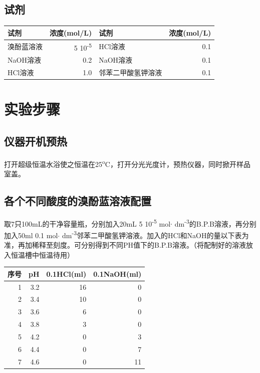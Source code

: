 \documentclass[11pt]{report}
\begin{document}
\section{试剂}
\label{sec:org343bc96}
\begin{center}
\begin{tabular}{lrlr}
试剂 & 浓度(mol/L) & 试剂 & 浓度(mol/L)\\
\hline
溴酚蓝溶液 & 5\texttimes{} 10\textsuperscript{-5} & HCl溶液 & 0.1\\
NaOH溶液 & 0.2 & NaOH溶液 & 0.1\\
HCl溶液 & 1.0 & 邻苯二甲酸氢钾溶液 & 0.1\\
\end{tabular}
\end{center}

\chapter{实验步骤}
\label{sec:orgc86dd9a}
\section{仪器开机预热}
\label{sec:orge1da729}
打开超级恒温水浴使之恒温在25\textsuperscript{o}C，打开分光光度计，预热仪器，同时掀开样品室盖。
\section{各个不同酸度的溴酚蓝溶液配置}
\label{sec:org7fdeb64}
取7只100mL的干净容量瓶，分别加入20mL 5\texttimes{} 10\textsuperscript{-5} mol\(\cdot\) dm\textsuperscript{-3}的B.P.B溶液，再分别加入50ml 0.1 mol\(\cdot\) dm\textsuperscript{-3}邻苯二甲酸氢钾溶液。加入的HCl和NaOH的量以下表为准，再加稀释至刻度。可分别得到不同PH值下的B.P.B溶液。（将配制好的溶液放入恒温槽中恒温待用）
\begin{center}
\begin{tabular}{rrrr}
序号 & pH & 0.1HCl(ml) & 0.1NaOH(ml)\\
\hline
1 & 3.2 & 16 & 0\\
2 & 3.4 & 10 & 0\\
3 & 3.6 & 6 & 0\\
4 & 3.8 & 3 & 0\\
5 & 4.2 & 0 & 3\\
6 & 4.4 & 0 & 7\\
7 & 4.6 & 0 & 11\\
\end{tabular}
\end{center}
\end{document}
